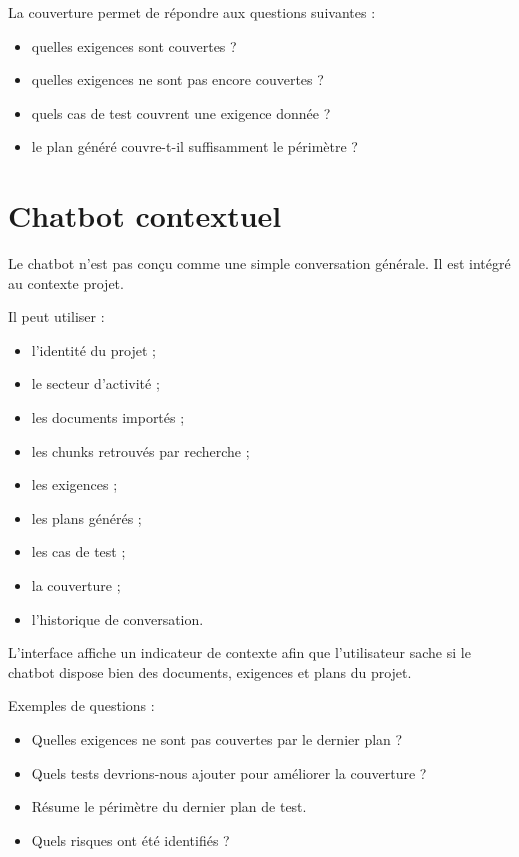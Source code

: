 \documentclass[
  french,
]{report}
\providecommand{\tightlist}{%
  \setlength{\itemsep}{0pt}\setlength{\parskip}{0pt}}
\begin{document}
La couverture permet de répondre aux questions suivantes :

\begin{itemize}
\tightlist
\item
  quelles exigences sont couvertes ?
\item
  quelles exigences ne sont pas encore couvertes ?
\item
  quels cas de test couvrent une exigence donnée ?
\item
  le plan généré couvre-t-il suffisamment le périmètre ?
\end{itemize}

\chapter{Chatbot contextuel}\label{chatbot-contextuel-1}

Le chatbot n'est pas conçu comme une simple conversation générale. Il
est intégré au contexte projet.

Il peut utiliser :

\begin{itemize}
\tightlist
\item
  l'identité du projet ;
\item
  le secteur d'activité ;
\item
  les documents importés ;
\item
  les chunks retrouvés par recherche ;
\item
  les exigences ;
\item
  les plans générés ;
\item
  les cas de test ;
\item
  la couverture ;
\item
  l'historique de conversation.
\end{itemize}

L'interface affiche un indicateur de contexte afin que l'utilisateur
sache si le chatbot dispose bien des documents, exigences et plans du
projet.

Exemples de questions :

\begin{itemize}
\tightlist
\item
  Quelles exigences ne sont pas couvertes par le dernier plan ?
\item
  Quels tests devrions-nous ajouter pour améliorer la couverture ?
\item
  Résume le périmètre du dernier plan de test.
\item
  Quels risques ont été identifiés ?
\end{itemize}
\end{document}

